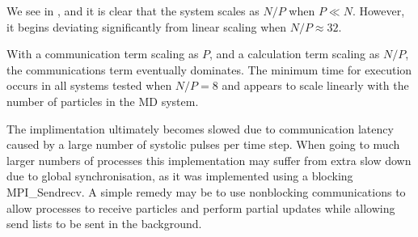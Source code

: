 \begin{figure}[!h]
    
    \caption{}
    \label{fig:v0_systolic_pair_operation_4096_logtime}
\end  {figure}

\begin{figure}[!h]
    
    \caption{}
    \label{fig:v0_systolic_pair_operation_32768_logtime}
\end  {figure}

\vZeroTimeExplanation
{}
{}
{}
{\pairoperation{}}
{\systolicloop{}}

We see in 
,
 and
it is clear that the system scales as $N/P$ when $P \ll{} N$.
%
However, it begins deviating significantly from linear scaling
when $N/P \approx{} 32$.

With a communication term scaling as $P$, and a calculation term
scaling as $N/P$, the communications term eventually dominates.
%
The minimum time for execution occurs in all systems tested when $N/P = 8$
and appears to scale linearly with the number of particles in the MD system.

The implimentation ultimately becomes slowed due to
communication latency caused by a large number
of systolic pulses per time step.
%
When going to much larger numbers of processes
this implementation may suffer from extra slow down due to
global synchronisation, as it was implemented using a blocking
MPI\_Sendrecv.
%
A simple remedy may be to use nonblocking communications to allow
processes to receive particles and perform partial updates while
allowing send lists to be sent in the background.

